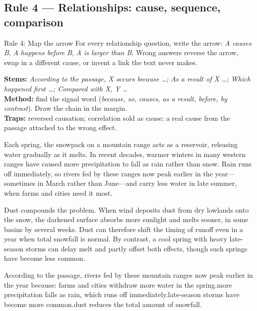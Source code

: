 \documentclass[11pt]{article}
\begin{document}
\subsection{Rule 4 --- Relationships: cause, sequence, comparison}
\begin{rulebox}{Rule 4: Map the arrow}
For every relationship question, write the arrow: \emph{A causes B}, \emph{A happens before B}, \emph{A is larger than B}. Wrong answers reverse the arrow, swap in a different cause, or invent a link the text never makes.
\end{rulebox}
\textbf{Stems:} \emph{According to the passage, X occurs because \dots; As a result of X \dots; Which happened first \dots; Compared with X, Y \dots}\\
\textbf{Method:} find the signal word (\emph{because, so, causes, as a result, before, by contrast}). Draw the chain in the margin.\\
\textbf{Traps:} reversed causation; correlation sold as cause; a real cause from the passage attached to the wrong effect.

\begin{passage}
Each spring, the snowpack on a mountain range acts as a reservoir, releasing water gradually as it melts. In recent decades, warmer winters in many western ranges have caused more precipitation to fall as rain rather than snow. Rain runs off immediately, so rivers fed by these ranges now peak earlier in the year---sometimes in March rather than June---and carry less water in late summer, when farms and cities need it most.

Dust compounds the problem. When wind deposits dust from dry lowlands onto the snow, the darkened surface absorbs more sunlight and melts sooner, in some basins by several weeks. Dust can therefore shift the timing of runoff even in a year when total snowfall is normal. By contrast, a cool spring with heavy late-season storms can delay melt and partly offset both effects, though such springs have become less common.
\end{passage}

{According to the passage, rivers fed by these mountain ranges now peak earlier in the year because:}
{farms and cities withdraw more water in the spring.}{more precipitation falls as rain, which runs off immediately.}{late-season storms have become more common.}{dust reduces the total amount of snowfall.}
\end{document}
